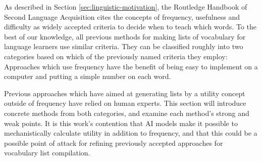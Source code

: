 
As described in Section \ref{sec:linguistic-motivation}, the Routledge Handbook of Second Language Acquisition cites the concepts of frequency, usefulness and difficulty as widely accepted criteria to decide when to teach which words.
To the best of our knowledge, all previous methods for making lists of vocabulary for language learners use similar criteria.
They can be classified roughly into two categories based on which of the previously named criteria they employ:
Approaches which use frequency have the benefit of being easy to implement on a computer and putting a simple number on each word.

Previous approaches which have aimed at generating lists by a utility concept outside of frequency have relied on human experts.
This section will introduce concrete methods from both categories, and examine each method's strong and weak points.
It is this work's contention that AI models make it possible to mechanistically calculate utility in addition to frequency, and that this could be a possible point of attack for refining previously accepted approaches for vocabulary list compilation.



